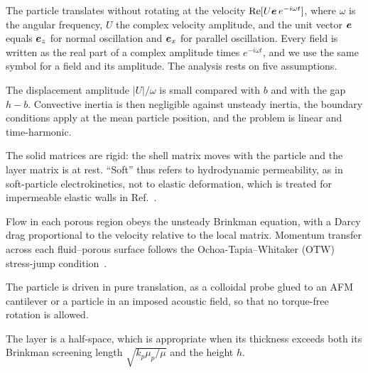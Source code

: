 The particle translates without rotating at the velocity $\operatorname{Re}[U\bm{e}\,e^{-i\omega t}]$, where $\omega$ is
the angular frequency, $U$ the complex velocity amplitude, and the unit vector $\bm{e}$ equals $\bm{e}_z$ for normal
oscillation and $\bm{e}_x$ for parallel oscillation. Every field is written as the real part of a complex amplitude times
$e^{-i\omega t}$, and we use the same symbol for a field and its amplitude. The analysis rests on five assumptions.

\begin{assumption}\label{as:linear}
The displacement amplitude $|U|/\omega$ is small compared with $b$ and with the gap $h-b$. Convective inertia is then
negligible against unsteady inertia, the boundary conditions apply at the mean particle position, and the problem
is linear and time-harmonic.
\end{assumption}
\begin{assumption}\label{as:rigid}
The solid matrices are rigid: the shell matrix moves with the particle and the layer matrix is at rest. ``Soft'' thus
refers to hydrodynamic permeability, as in soft-particle electrokinetics, not to elastic deformation, which is treated
for impermeable elastic walls in Ref.~.
\end{assumption}
\begin{assumption}\label{as:brinkman}
Flow in each porous region obeys the unsteady Brinkman equation, with a Darcy drag proportional to the velocity relative
to the local matrix. Momentum transfer across each fluid--porous surface follows the Ochoa-Tapia--Whitaker (OTW)
stress-jump condition~\cite{ochoatapia1995momentum}.
\end{assumption}
\begin{assumption}\label{as:norotation}
The particle is driven in pure translation, as a colloidal probe glued to an AFM cantilever or a particle in an imposed
acoustic field, so that no torque-free rotation is allowed.
\end{assumption}
\begin{assumption}\label{as:thick}
The layer is a half-space, which is appropriate when its thickness exceeds both its Brinkman screening length
$\sqrt{k_p\mu_p/\mu}$ and the height $h$.
\end{assumption}

